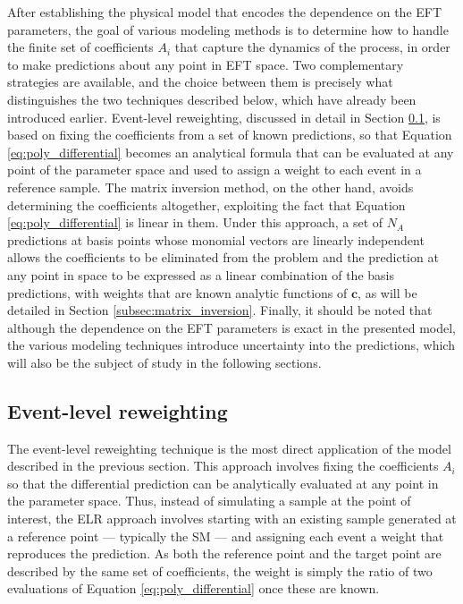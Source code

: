 After establishing the physical model that encodes the dependence on the EFT parameters, the goal of various modeling methods is to determine how to handle the finite set of coefficients $A_i$ that capture the dynamics of the process, in order to make predictions about any point in EFT space. Two complementary strategies are available, and the choice between them is precisely what distinguishes the two techniques described below, which have already been introduced earlier. Event-level reweighting, discussed in detail in Section \ref{subsec:ELR}, is based on fixing the coefficients from a set of known predictions, so that Equation \ref{eq:poly_differential} becomes an analytical formula that can be evaluated at any point of the parameter space and used to assign a weight to each event in a reference sample. The matrix inversion method, on the other hand, avoids determining the coefficients altogether, exploiting the fact that Equation \ref{eq:poly_differential} is linear in them. Under this approach, a set of $N_A$ predictions at basis points whose monomial vectors are linearly independent allows the coefficients to be eliminated from the problem and the prediction at any point in space to be expressed as a linear combination of the basis predictions, with weights that are known analytic functions of $\mathbf{c}$, as will be detailed in Section \ref{subsec:matrix_inversion}. Finally, it should be noted that although the dependence on the EFT parameters is exact in the presented model, the various modeling techniques introduce uncertainty into the predictions, which will also be the subject of study in the following sections.



\subsection{Event-level reweighting}
\label{subsec:ELR}
The event-level reweighting technique is the most direct application of the model described in the previous section. This approach involves fixing the coefficients $A_i$ so that the differential prediction can be analytically evaluated at any point in the parameter space. Thus, instead of simulating a sample at the point of interest, the ELR approach involves starting with an existing sample generated at a reference point — typically the SM — and assigning each event a weight that reproduces the prediction. As both the reference point and the target point are described by the same set of coefficients, the weight is simply the ratio of two evaluations of Equation \ref{eq:poly_differential} once these are known.\\

